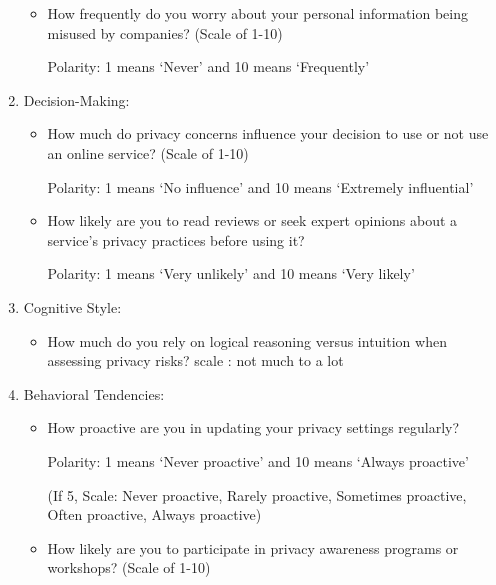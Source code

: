\begin{enumerate}
\begin{itemize}
        \item How frequently do you worry about your personal information being misused by companies? (Scale of 1-10)

        Polarity: 1 means ‘Never’ and 10 means ‘Frequently’
    \end{itemize}
\item Decision-Making:
    \begin{itemize}
        \item How much do privacy concerns influence your decision to use or not use an online service? (Scale of 1-10)

        Polarity: 1 means ‘No influence’ and 10 means ‘Extremely influential’
        
        \item How likely are you to read reviews or seek expert opinions about a service’s privacy practices before using it?

        Polarity: 1 means ‘Very unlikely’ and 10 means ‘Very likely’
    \end{itemize}
\item Cognitive Style:
    \begin{itemize}
        \item How much do you rely on logical reasoning versus intuition when assessing privacy risks?
        scale : not much to a lot
    \end{itemize}
\item Behavioral Tendencies:
    \begin{itemize}
        \item How proactive are you in updating your privacy settings regularly?

        Polarity: 1 means ‘Never proactive’ and 10 means ‘Always proactive’

        (If 5, Scale: Never proactive, Rarely proactive, Sometimes proactive, Often proactive, Always proactive)
        
        \item How likely are you to participate in privacy awareness programs or workshops? (Scale of 1-10)


\end{itemize}
\end{enumerate}

